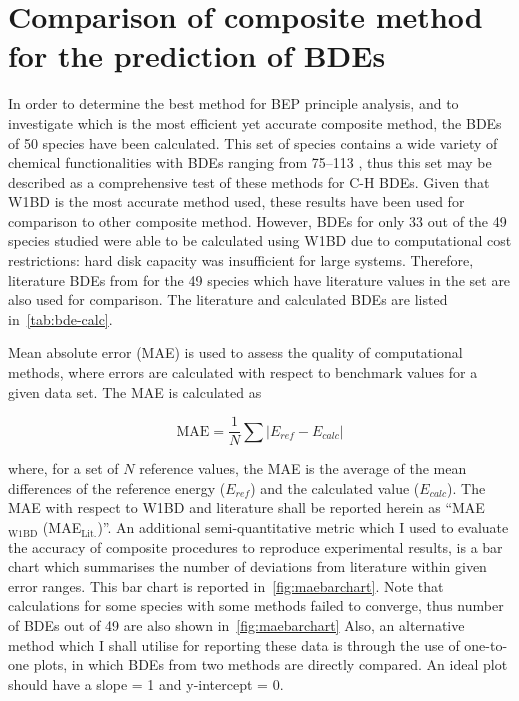 \section{Comparison of composite method for the prediction of BDEs}

In order to determine the best method for BEP principle analysis, and to investigate which is the most efficient yet accurate composite method, the BDEs of 50 species have been calculated. This set of species contains a wide variety of chemical functionalities with BDEs ranging from 75--113 \kcalmol, thus this set may be described as a comprehensive test of these methods for C-H BDEs. Given that W1BD is the most accurate method used, these results have been used for comparison to other composite method. However, BDEs for only 33 out of the 49 species studied were able to be calculated using W1BD due to computational cost restrictions: hard disk capacity was insufficient for large systems. Therefore, literature BDEs from \citet{Luo2002} for the 49 species which have literature values in the set are also used for comparison. The literature and calculated BDEs are listed in~\ref{tab:bde-calc}.

\begin{landscape}

\end{landscape}

Mean absolute error (MAE) is used to assess the quality of computational methods, where errors are calculated with respect to benchmark values for a given data set.\cite{Savin2014} The MAE is calculated as

\begin{equation}
  \mathrm{MAE} = \frac{1}{N} \sum | E_{ref} - E_{calc}|
\end{equation}

\noindent where, for a set of $N$ reference values, the MAE is the average of the mean differences of the reference energy ($E_{ref}$) and the calculated value ($E_{calc}$). The MAE with respect to W1BD and literature shall be reported herein as ``MAE$_{\mathrm{W1BD}}$ (MAE$_{\mathrm{Lit.}}$)''. An additional semi-quantitative metric which I used to evaluate the accuracy of composite procedures to reproduce experimental results, is a bar chart which summarises the number of deviations from literature within given error ranges. This bar chart is reported in~\ref{fig:maebarchart}. Note that calculations for some species with some methods failed to converge, thus number of BDEs out of 49 are also shown in~\ref{fig:maebarchart} Also, an alternative method which I shall utilise for reporting these data is through the use of one-to-one plots, in which BDEs from two methods are directly compared. An ideal plot should have a slope = 1 and y-intercept = 0.

